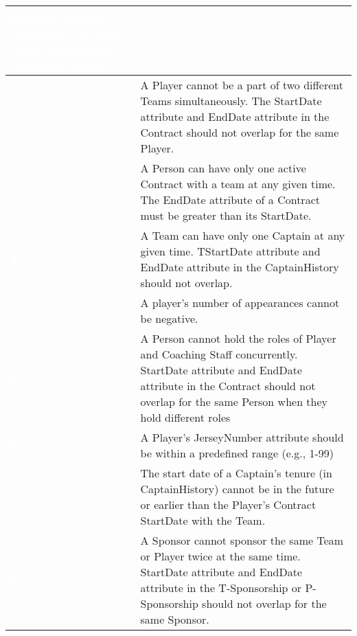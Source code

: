 \begin{table}[H]
  \def\arraystretch{1.25}%
  \centering
  \begin{tabular}{|>{\columncolor{myColor}}  m{1.5cm} | m{13.5cm}| }
    \hline
    \rowcolor{myColor}
    \multicolumn{2}{| c |}  {\textcolor{white}{\large \textbf{External integrity constraints in terms of the restructured relational schema}}} \\
    \hline
     {\textcolor{white}{\textbf{1}}} & A Player cannot be a part of two different Teams simultaneously. The StartDate attribute and EndDate attribute in the Contract should not overlap for the same Player. \\
    \hline
     {\textcolor{white}{\textbf{2}}} & A Person can have only one active Contract with a team at any given time. The EndDate attribute of a Contract must be greater than its StartDate.\\
    \hline
     {\textcolor{white}{\textbf{3}}} & A Team can have only one Captain at any given time. TStartDate attribute and EndDate attribute in the CaptainHistory should not overlap. \\
    \hline
     {\textcolor{white}{\textbf{4}}} & A player’s number of appearances cannot be negative.\\
    \hline
     {\textcolor{white}{\textbf{5}}} & A Person cannot hold the roles of Player and Coaching Staff concurrently. StartDate attribute and EndDate attribute in the Contract should not overlap for the same Person when they hold different roles\\
    \hline
     {\textcolor{white}{\textbf{6}}} & A Player’s JerseyNumber attribute should be within a predefined range (e.g., 1-99) \\
    \hline
     {\textcolor{white}{\textbf{7}}} & The start date of a Captain’s tenure (in CaptainHistory) cannot be in the future or earlier than the Player’s Contract StartDate with the Team.\\
    \hline
    {\textcolor{white}{\textbf{8}}} & A Sponsor cannot sponsor the same Team or Player twice at the same time. StartDate attribute and EndDate attribute in the T-Sponsorship or P-Sponsorship should not overlap for the same Sponsor. \\
    \hline
  \end{tabular}\label{tab:table10}
\end{table}


\pagebreak

